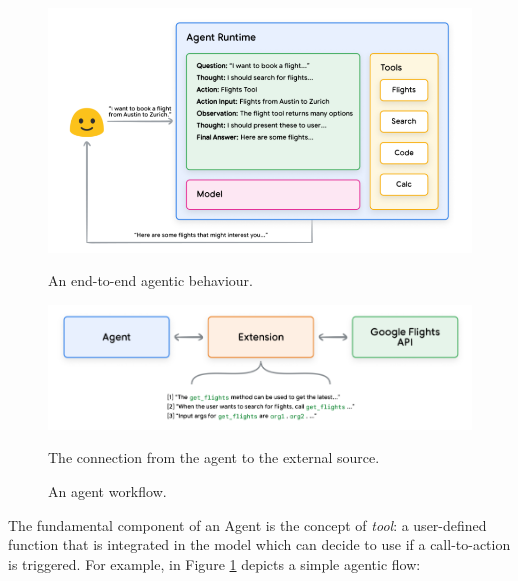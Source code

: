 
\begin{figure}[h]
    \centering
    \begin{minipage}{0.45\textwidth}
        \centering
        \includegraphics[width=\textwidth]{images/agents.png}
        \caption{An end-to-end agentic behaviour.}
    \end{minipage}
    \hfill
    \begin{minipage}{0.45\textwidth}
        \centering
        \includegraphics[width=\textwidth]{images/agents-ii.png}
        \caption{The connection from the agent to the external source.}
    \end{minipage}
    \caption{An agent workflow.}
    \label{fig:agent-ai}
\end{figure}

The fundamental component of an Agent is the concept of \textit{tool}: a user-defined function that is integrated in the model which can decide to use if a call-to-action is triggered. For example, in Figure \ref{fig:agent-ai} depicts a simple agentic flow:

